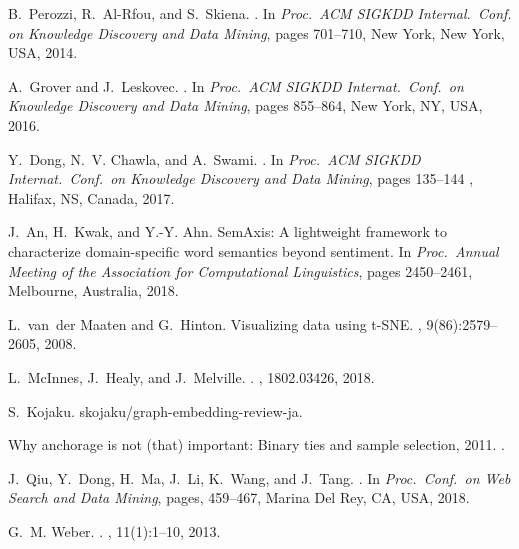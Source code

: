 \documentclass[12pt]{jarticle}
\begin{document}
\begin{thebibliography}{10}
B.~Perozzi, R.~Al-Rfou, and S.~Skiena.
.
\newblock In {\em Proc.~ACM SIGKDD Internal.~Conf. on Knowledge Discovery and Data Mining}, pages 701--710, New York, New York, USA, 2014.

A.~Grover and J.~Leskovec.
.
\newblock In {\em Proc.~ACM SIGKDD Internat.~Conf.~on Knowledge Discovery and Data Mining}, pages 855--864, New York,
  NY, USA, 2016.

Y.~Dong, N.~V. Chawla, and A.~Swami.
.
\newblock In {\em Proc.~ACM SIGKDD Internat.~Conf.~on Knowledge Discovery and Data Mining}, pages 135--144 , Halifax, NS, Canada, 2017.

J.~An, H.~Kwak, and Y.-Y. Ahn.
\newblock SemAxis: A lightweight framework to characterize domain-specific word semantics beyond sentiment.
\newblock In {\em Proc.~Annual Meeting of the Association for Computational Linguistics}, pages 2450--2461, Melbourne, Australia, 2018.

L.~van~der Maaten and G.~Hinton.
\newblock Visualizing data using t-SNE.
, 9(86):2579--2605, 2008.

L.~McInnes, J.~Healy, and J.~Melville.
.
, 1802.03426, 2018.

S.~Kojaku.
\newblock skojaku/graph-embedding-review-ja.

Why anchorage is not (that) important: Binary ties and sample selection, 2011.
.

J.~Qiu, Y.~Dong, H.~Ma, J.~Li, K.~Wang, and J.~Tang.
.
\newblock In {\em Proc.~Conf.~on Web Search and Data Mining}, pages, 459--467, Marina Del Rey, CA, USA, 2018.

G.~M. Weber.
.
, 11(1):1--10, 2013.


\end{thebibliography}
\end{document}
